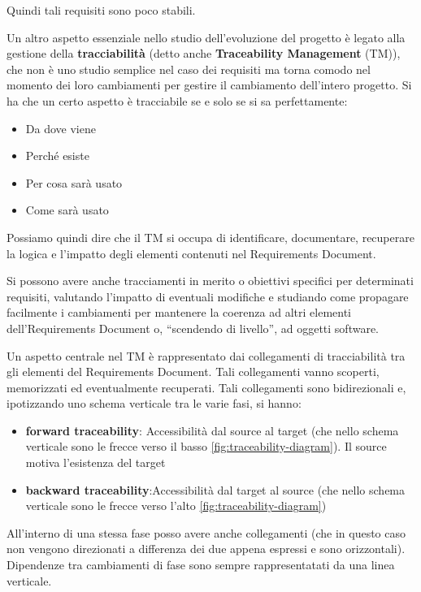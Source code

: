 Quindi tali requisiti sono poco stabili.

Un altro aspetto essenziale nello studio dell'evoluzione del progetto è legato
alla gestione della \textbf{tracciabilità} (detto anche \textbf{Traceability Management}
(TM)), che non è uno studio semplice nel caso dei requisiti ma torna comodo nel
momento dei loro cambiamenti per gestire il cambiamento dell'intero progetto. Si ha
che un certo aspetto è tracciabile se e solo se si sa perfettamente:
\begin{itemize}
      \item Da dove viene
      \item Perché esiste
      \item Per cosa sarà usato
      \item Come sarà usato
\end{itemize}
Possiamo quindi dire che il TM si occupa di identificare, documentare, recuperare
la logica e l'impatto degli elementi contenuti nel Requirements Document.

Si possono avere anche tracciamenti in merito o obiettivi specifici per determinati
requisiti, valutando l'impatto di eventuali modifiche e studiando come propagare
facilmente i cambiamenti per mantenere la coerenza ad altri elementi
dell'Requirements Document o, “scendendo di livello”, ad oggetti software.

Un aspetto centrale nel TM è rappresentato dai collegamenti di tracciabilità tra
gli elementi del Requirements Document. Tali collegamenti vanno scoperti,
memorizzati ed eventualmente recuperati. Tali collegamenti sono bidirezionali e,
ipotizzando uno schema verticale tra le varie fasi, si hanno:
\begin{itemize}
      \item \textbf{forward traceability}: Accessibilità dal source al target
            (che nello schema verticale sono le frecce verso il basso \ref{fig:traceability-diagram}).
            Il source motiva l'esistenza del target
      \item \textbf{backward traceability}:Accessibilità dal target al source
            (che nello schema verticale sono le frecce verso l'alto \ref{fig:traceability-diagram})
\end{itemize}
All'interno di una stessa fase posso avere anche collegamenti (che in questo caso
non vengono direzionati a differenza dei due appena espressi e sono orizzontali).
Dipendenze tra cambiamenti di fase sono sempre rappresentatati da una linea verticale.

